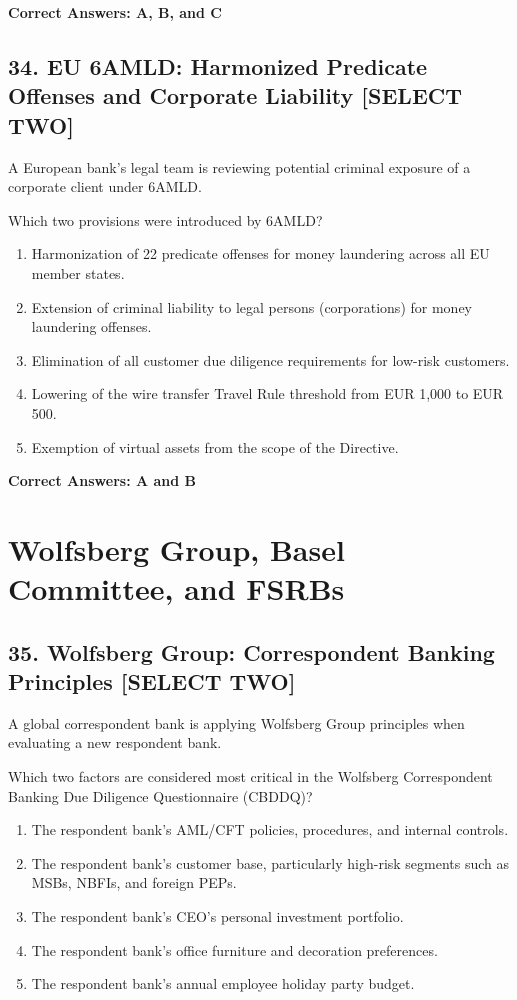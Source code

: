 \documentclass[11pt,a4paper]{article}
\begin{document}
	\textbf{Correct Answers: A, B, and C}
	
	\subsection{34. EU 6AMLD: Harmonized Predicate Offenses and Corporate Liability \textnormal{[SELECT TWO]}}
	
	A European bank's legal team is reviewing potential criminal exposure of a corporate client under 6AMLD.
	
	Which two provisions were introduced by 6AMLD?
	
	\begin{enumerate}[label=\Alph*.]
		\item Harmonization of 22 predicate offenses for money laundering across all EU member states.
		\item Extension of criminal liability to legal persons (corporations) for money laundering offenses.
		\item Elimination of all customer due diligence requirements for low-risk customers.
		\item Lowering of the wire transfer Travel Rule threshold from EUR 1,000 to EUR 500.
		\item Exemption of virtual assets from the scope of the Directive.
	\end{enumerate}
	
	\textbf{Correct Answers: A and B}
	
	\section{Wolfsberg Group, Basel Committee, and FSRBs}
	
	\subsection{35. Wolfsberg Group: Correspondent Banking Principles \textnormal{[SELECT TWO]}}
	
	A global correspondent bank is applying Wolfsberg Group principles when evaluating a new respondent bank.
	
	Which two factors are considered most critical in the Wolfsberg Correspondent Banking Due Diligence Questionnaire (CBDDQ)?
	
	\begin{enumerate}[label=\Alph*.]
		\item The respondent bank's AML/CFT policies, procedures, and internal controls.
		\item The respondent bank's customer base, particularly high-risk segments such as MSBs, NBFIs, and foreign PEPs.
		\item The respondent bank's CEO's personal investment portfolio.
		\item The respondent bank's office furniture and decoration preferences.
		\item The respondent bank's annual employee holiday party budget.
	\end{enumerate}
	
\end{document}
